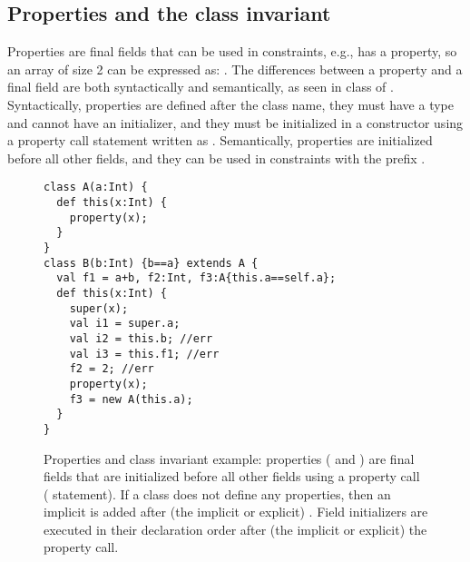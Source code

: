 \subsection{Properties and the class invariant}
Properties are final fields that can be used in constraints,
    e.g.,  has a  property,
    so an array of size 2 can be expressed as: .
The differences between a property and a final field are both syntactically and semantically,
    as seen in class  of .
Syntactically, properties are defined after the class name,
    they must have a type and cannot have an initializer,
    and they must be initialized in a constructor using a property call statement written as .
Semantically, properties are initialized before all other fields,
    and they can be used in constraints with the prefix .


\begin{figure}
\begin{lstlisting}
class A(a:Int) {
  def this(x:Int) {
    property(x);
  }
}
class B(b:Int) {b==a} extends A {
  val f1 = a+b, f2:Int, f3:A{this.a==self.a};
  def this(x:Int) {
    super(x);
    val i1 = super.a;
    val i2 = this.b; //err
    val i3 = this.f1; //err
    f2 = 2; //err
    property(x);
    f3 = new A(this.a);
  }
}
\end{lstlisting}
\caption{Properties and class invariant example:
        properties ( and )
        are final fields that are initialized before all other fields
        using a property call ( statement).
    {If a class does not define any properties, then
        an implicit  is added
        after (the implicit or explicit) .}
    {Field initializers are executed in their declaration order
        after (the implicit or explicit) the property call.}
    }
\label{Figure:Properties}
\end{figure}


